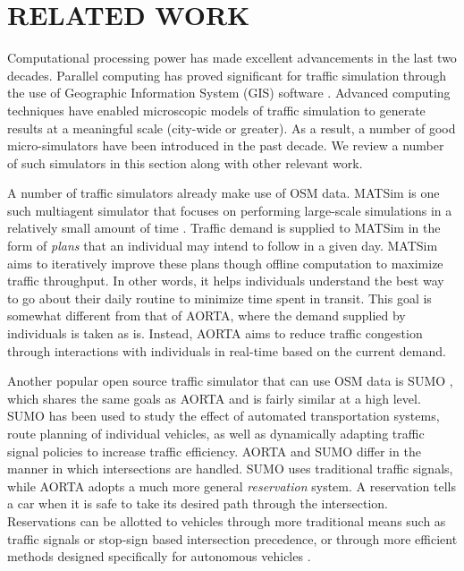 \documentclass[letterpaper, 10 pt, conference]{ieeeconf}  %
\begin{document}

\section{RELATED WORK}
\label{sec:related_work}


Computational processing power has made excellent advancements in the
last two decades. Parallel computing has proved significant for
traffic simulation through the use of Geographic Information System
(GIS) software \cite{pursula1999simulation}. Advanced computing
techniques have enabled microscopic models of traffic simulation to
generate results at a meaningful scale (city-wide or greater). As a
result, a number of good micro-simulators have been introduced in the
past decade. We review a number of such simulators in this section
along with other relevant work.

A number of traffic simulators already make use of OSM data. MATSim is one such
multiagent simulator that focuses on performing large-scale simulations in a
relatively small amount of time \cite{balmer2009matsim}. Traffic demand is
supplied to MATSim in the form of \textit{plans} that an individual may intend
to follow in a given day. MATSim aims to iteratively improve these plans though
offline computation to maximize traffic throughput. In other words, it helps
individuals understand the best way to go about their daily routine to minimize
time spent in transit. This goal is somewhat different from that of AORTA,
where the demand supplied by individuals is taken as is. Instead, AORTA aims to
reduce traffic congestion through interactions with individuals in real-time
based on the current demand.


Another popular open source traffic simulator that can use OSM data is SUMO
\cite{SUMO2011}, which shares the same goals as AORTA and is fairly similar at
a high level. SUMO has been used to study the effect of automated
transportation systems, route planning of individual vehicles, as well as
dynamically adapting traffic signal policies to increase traffic efficiency.
AORTA and SUMO differ in the manner in which intersections are handled. SUMO
uses traditional traffic signals, while AORTA adopts a much more general
\textit{reservation} system. A reservation tells a car when it is safe to take
its desired path through the intersection. Reservations can be allotted to
vehicles through more traditional means such as traffic signals or stop-sign
based intersection precedence, or through more efficient methods designed
specifically for autonomous vehicles \cite{JAIR08-dresner}.
\end{document}
